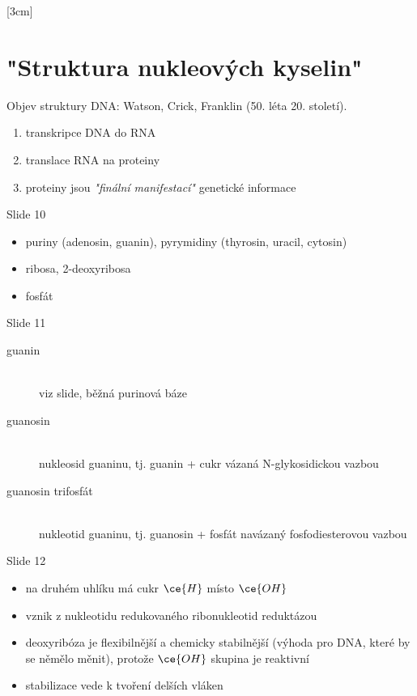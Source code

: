 \documentclass[DIV=8]{scrreprt}
\begin{document}
[3cm]

\chapter{"Struktura nukleových kyselin"}

Objev struktury DNA: Watson, Crick, Franklin (50. léta 20. století).

\begin{enumerate}
    \item transkripce DNA do RNA
    \item translace RNA na proteiny
    \item proteiny jsou \emph{"finální manifestací"} genetické informace
\end{enumerate}


Slide 10
\begin{itemize}
    \item puriny (adenosin, guanin), pyrymidiny (thyrosin, uracil, cytosin)
    \item ribosa, 2-deoxyribosa
    \item fosfát
\end{itemize}


Slide 11
\begin{description}
\item[guanin]\hfill \\
viz slide, běžná purinová báze


\item[guanosin]\hfill \\
nukleosid guaninu, tj. guanin + cukr vázaná N-glykosidickou vazbou


\item[guanosin trifosfát]\hfill \\
nukleotid guaninu, tj. guanosin + fosfát navázaný fosfodiesterovou vazbou

\end{description}


Slide 12
\begin{itemize}
    \item na druhém uhlíku má cukr \(\ce{H}\) místo \(\ce{OH}\)
    \item vznik z nukleotidu redukovaného ribonukleotid reduktázou
    \item deoxyribóza je flexibilnější a chemicky stabilnější (výhoda pro DNA, které by se němělo měnit), protože \(\ce{OH}\) skupina je reaktivní
    \item stabilizace vede k tvoření delších vláken
\end{itemize}
\end{document}
